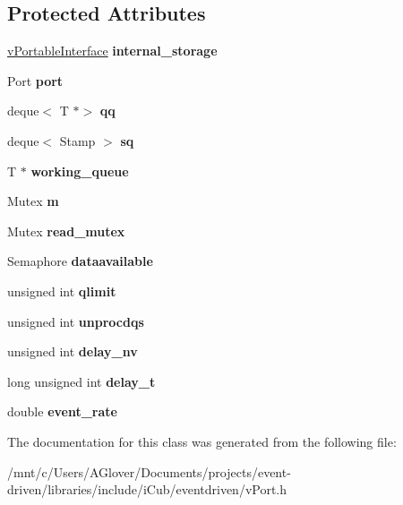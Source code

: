 \subsection*{Protected Attributes}
\begin{DoxyCompactItemize}
\item 
\mbox{\label{classev_1_1vReadPort_a7d2052a556597fb452648acfc9c69c7c}} 
\hyperlink{classev_1_1vPortableInterface}{v\+Portable\+Interface} {\bfseries internal\+\_\+storage}
\item 
\mbox{\label{classev_1_1vReadPort_af7dc70719d3d3b747410cac249375cd1}} 
Port {\bfseries port}
\item 
\mbox{\label{classev_1_1vReadPort_a0a644757f74909b9ffc65cdf573c62a9}} 
deque$<$ T $\ast$$>$ {\bfseries qq}
\item 
\mbox{\label{classev_1_1vReadPort_a1f90047aed50cbf8b76e0b75e2330eb1}} 
deque$<$ Stamp $>$ {\bfseries sq}
\item 
\mbox{\label{classev_1_1vReadPort_a16253ae31557093d1678bcf7b9907208}} 
T $\ast$ {\bfseries working\+\_\+queue}
\item 
\mbox{\label{classev_1_1vReadPort_a35bb3489d3fa7fe86c0ef7b563305976}} 
Mutex {\bfseries m}
\item 
\mbox{\label{classev_1_1vReadPort_a1481febbd2f80b1874090aea1365e9dd}} 
Mutex {\bfseries read\+\_\+mutex}
\item 
\mbox{\label{classev_1_1vReadPort_afbcd0f47ccdafcedc57a2f23d104a145}} 
Semaphore {\bfseries dataavailable}
\item 
\mbox{\label{classev_1_1vReadPort_a35f6fe719860861eaaf9b2ebc30ac99e}} 
unsigned int {\bfseries qlimit}
\item 
\mbox{\label{classev_1_1vReadPort_acdcf63464771194e87d0fdd8226361a0}} 
unsigned int {\bfseries unprocdqs}
\item 
\mbox{\label{classev_1_1vReadPort_af6ce0d204c3fc755b32a31cdcc3b55b0}} 
unsigned int {\bfseries delay\+\_\+nv}
\item 
\mbox{\label{classev_1_1vReadPort_a440488d899ba95a07ec610616ffc9cd2}} 
long unsigned int {\bfseries delay\+\_\+t}
\item 
\mbox{\label{classev_1_1vReadPort_a9888128c255eaf3cc2d528590b8bf12f}} 
double {\bfseries event\+\_\+rate}
\end{DoxyCompactItemize}


The documentation for this class was generated from the following file\+:\begin{DoxyCompactItemize}
\item 
/mnt/c/\+Users/\+A\+Glover/\+Documents/projects/event-\/driven/libraries/include/i\+Cub/eventdriven/v\+Port.\+h\end{DoxyCompactItemize}

